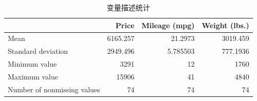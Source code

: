 \begin{table}[htbp]
  \centering
  \caption{ 变量描述统计 }
  \label{tab:stat}
  \small
  \begin{tabular}{llll}
    \toprule
    \multicolumn{1}{c}{} &
      \multicolumn{1}{r}{Price} &
      \multicolumn{1}{r}{Mileage (mpg)} &
      \multicolumn{1}{r}{Weight (lbs.)} \\
    \midrule
    \multicolumn{1}{l}{Mean} &
      \multicolumn{1}{r}{6165.257} &
      \multicolumn{1}{r}{21.2973} &
      \multicolumn{1}{r}{3019.459} \\
    \multicolumn{1}{l}{Standard deviation} &
      \multicolumn{1}{r}{2949.496} &
      \multicolumn{1}{r}{5.785503} &
      \multicolumn{1}{r}{777.1936} \\
    \multicolumn{1}{l}{Minimum value} &
      \multicolumn{1}{r}{3291} &
      \multicolumn{1}{r}{12} &
      \multicolumn{1}{r}{1760} \\
    \multicolumn{1}{l}{Maximum value} &
      \multicolumn{1}{r}{15906} &
      \multicolumn{1}{r}{41} &
      \multicolumn{1}{r}{4840} \\
    \multicolumn{1}{l}{Number of nonmissing values} &
      \multicolumn{1}{r}{74} &
      \multicolumn{1}{r}{74} &
      \multicolumn{1}{r}{74} \\
    \bottomrule
  \end{tabular}
\end{table}
